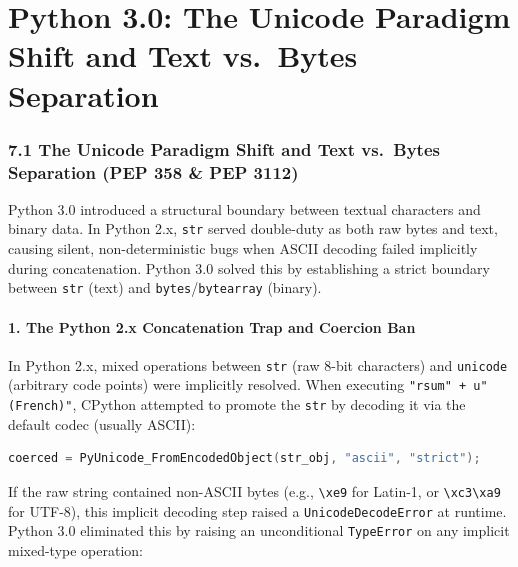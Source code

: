 \hypertarget{python-3.0-the-unicode-paradigm-shift-and-text-vs.-bytes-separation}{%
\chapter{Python 3.0: The Unicode Paradigm Shift and Text vs.~Bytes
Separation}\label{python-3.0-the-unicode-paradigm-shift-and-text-vs.-bytes-separation}}

\hypertarget{the-unicode-paradigm-shift-and-text-vs.-bytes-separation-pep-358-pep-3112}{%
\subsection{7.1 The Unicode Paradigm Shift and Text vs.~Bytes Separation
(PEP 358 \& PEP
3112)}\label{the-unicode-paradigm-shift-and-text-vs.-bytes-separation-pep-358-pep-3112}}

Python 3.0 introduced a structural boundary between textual characters
and binary data. In Python 2.x, \passthrough{\lstinline!str!} served
double-duty as both raw bytes and text, causing silent,
non-deterministic bugs when ASCII decoding failed implicitly during
concatenation. Python 3.0 solved this by establishing a strict boundary
between \passthrough{\lstinline!str!} (text) and
\passthrough{\lstinline!bytes!}/\passthrough{\lstinline!bytearray!}
(binary).

\hypertarget{the-python-2.x-concatenation-trap-and-coercion-ban}{%
\subsubsection{1. The Python 2.x Concatenation Trap and Coercion
Ban}\label{the-python-2.x-concatenation-trap-and-coercion-ban}}

In Python 2.x, mixed operations between \passthrough{\lstinline!str!}
(raw 8-bit characters) and \passthrough{\lstinline!unicode!} (arbitrary
code points) were implicitly resolved. When executing
\passthrough{\lstinline!"rsum" + u" (French)"!}, CPython attempted to
promote the \passthrough{\lstinline!str!} by decoding it via the default
codec (usually ASCII):

\begin{lstlisting}[language=C]
coerced = PyUnicode_FromEncodedObject(str_obj, "ascii", "strict");
\end{lstlisting}

If the raw string contained non-ASCII bytes (e.g.,
\passthrough{\lstinline!\\xe9!} for Latin-1, or
\passthrough{\lstinline!\\xc3\\xa9!} for UTF-8), this implicit decoding
step raised a \passthrough{\lstinline!UnicodeDecodeError!} at runtime.
Python 3.0 eliminated this by raising an unconditional
\passthrough{\lstinline!TypeError!} on any implicit mixed-type
operation:

